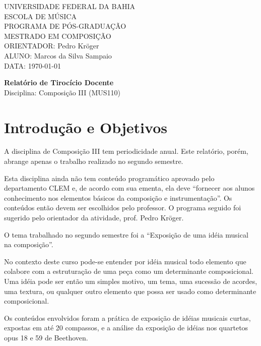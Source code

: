 \documentclass[12pt]{article}
\begin{document}
\setlength{\parindent}{0cm}

\large
UNIVERSIDADE FEDERAL DA BAHIA \\
ESCOLA DE MÚSICA \\
PROGRAMA DE PÓS-GRADUAÇÃO \\
MESTRADO EM COMPOSIÇÃO \\
ORIENTADOR: Pedro Kröger \\
ALUNO: Marcos da Silva Sampaio \\
DATA: \today

\thispagestyle{empty}
\vspace{1cm}
\begin{center}{
    \Huge \textbf{Relatório de Tirocício Docente} \\
}
\vspace{12pt}
{\Large Disciplina: Composição III (MUS110)}

\end{center}
\vspace{1cm}

\section{Introdução e Objetivos}
\label{sec:introducao}

A disciplina de Composição III tem periodicidade anual. Este
relatório, porém, abrange apenas o trabalho realizado no segundo
semestre.

Esta disciplina ainda não tem conteúdo programático aprovado pelo
departamento CLEM e, de acordo com sua ementa, ela deve ``fornecer aos
alunos conhecimento nos elementos básicos da composição e
instrumentação''. Os conteúdos então devem ser escolhidos pelo
professor. O programa seguido foi sugerido pelo orientador da
atividade, prof. Pedro Kröger.

O tema trabalhado no segundo semestre foi a ``Exposição de uma idéia
musical na composição''.

No contexto deste curso pode-se entender por idéia musical todo
elemento que colabore com a estruturação de uma peça como um
determinante composicional. Uma idéia pode ser então um simples
motivo, um tema, uma sucessão de acordes, uma textura, ou qualquer
outro elemento que possa ser usado como determinante composicional.

Os conteúdos envolvidos foram a prática de exposição de idéias
musicais curtas, expostas em até 20 compassos, e a análise da
exposição de idéias nos quartetos opus 18 e 59 de Beethoven.
\end{document}
